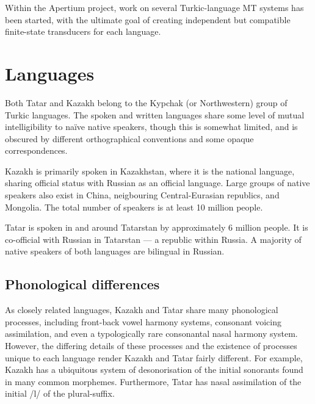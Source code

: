 \documentclass[11pt]{article}
\begin{document}

Within the Apertium project, work on several Turkic-language MT systems has been started, with the ultimate goal of creating independent but compatible
finite-state transducers for each language.

\section{Languages}
\label{sec:lang}

Both Tatar and Kazakh belong to the Kypchak (or Northwestern) group of Turkic
languages.  The spoken and written languages share some level of mutual intelligibility to naïve native speakers, though this is somewhat limited, and is obscured by different orthographical conventions and some opaque correspondences.

Kazakh is primarily spoken in Kazakhstan, where it is the national
language, sharing official status with Russian as an official language.
Large groups of native speakers also exist in China, neigbouring
Central-Eurasian republics, and Mongolia. The total number of speakers is at least 10 million people.

Tatar is spoken in and around Tatarstan by
approximately 6 million people. It is co-official with Russian in Tatarstan ---
a republic within Russia.  A majority of native speakers of both languages are bilingual in Russian. %

\subsection{Phonological differences}
As closely related languages, Kazakh and Tatar share many phonological processes, including front-back vowel harmony systems, consonant voicing assimilation, and even a typologically rare consonantal nasal harmony system.  However, the differing details of these processes and the existence of processes unique to each language render Kazakh and Tatar fairly different.  For example, Kazakh has a ubiquitous system of desonorisation of the initial sonorants found in many common morphemes.  Furthermore, Tatar has nasal assimilation of the initial /l/ of the plural-suffix.
\end{document}
